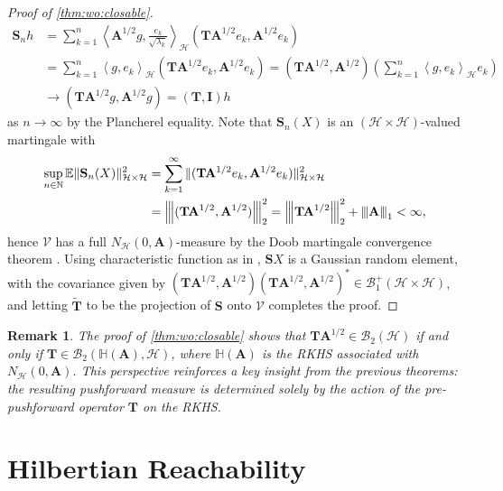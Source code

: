 \documentclass[noinfoline]{imsart}\setcounter{tocdepth}{2}
\renewcommand{\b}[1]{\mathbb{#1}} %
\newcommand{\m}[1]{\mathbf{#1}} %
\renewcommand{\c}[1]{\mathcal{#1}} %
\newcommand{\innpr}[2]{{\left\langle {#1},{#2}\right\rangle}} %
\newcommand{\vertiii}[1]{{\left\vert\kern-0.25ex\left\vert\kern-0.25ex\left\vert #1 
    \right\vert\kern-0.25ex\right\vert\kern-0.25ex\right\vert}} %
\theoremstyle{plain}
\newtheorem{remark}{Remark}[section]
\begin{document}
\begin{proof}[Proof of \cref{thm:wo:closable}]
\begin{align*}
    \m{S}_{n} h &= \sum_{k=1}^{n} \innpr{\m{A}^{1/2} g}{\frac{e_{k}}{\sqrt{\lambda_{k}}}}_{\c{H}} (\m{T} \m{A}^{1/2} e_{k}, \m{A}^{1/2} e_{k}) \\
    &= \sum_{k=1}^{n} \innpr{g}{e_{k}}_{\c{H}} (\m{T} \m{A}^{1/2} e_{k}, \m{A}^{1/2} e_{k}) = (\m{T}\m{A}^{1/2}, \m{A}^{1/2})  \left(\sum_{k=1}^{n} \innpr{g}{e_{k}}_{\c{H}} e_{k} \right) \\
    &\to (\m{T} \m{A}^{1/2} g, \m{A}^{1/2} g) = (\m{T}, \m{I}) h
\end{align*}
as $n \to \infty$ by the Plancherel equality.
Note that $\m{S}_{n}(X)$ is an $(\c{H} \times \c{H})$-valued martingale with
\begin{align*}
    \sup_{n \in \b{N}} \b{E} \|\m{S}_{n}(X)\|_{\c{H} \times \c{H}}^{2} &= \sum_{k=1}^{\infty} \|(\m{T} \m{A}^{1/2} e_{k}, \m{A}^{1/2} e_{k})\|_{\c{H} \times \c{H}}^{2} \\
    &= \vertiii{(\m{T} \m{A}^{1/2}, \m{A}^{1/2})}_{2}^{2} = \vertiii{\m{T} \m{A}^{1/2}}_{2}^{2} + \vertiii{\m{A}}_{1} < \infty,
\end{align*}
hence $\c{V}$ has a full $N_{\c{H}}(0, \m{A})$-measure by the Doob martingale convergence theorem \cite{kallenberg1997foundations}. Using characteristic function as in \cite[Proposition 4.40]{hairer2009introduction}, $\m{S} X$ is a Gaussian random element, with the covariance given by $(\m{T} \m{A}^{1/2}, \m{A}^{1/2})(\m{T} \m{A}^{1/2}, \m{A}^{1/2})^{*} \in \c{B}_{1}^{+}(\c{H} \times \c{H})$, and letting $\tilde{\m{T}}$ to be the projection of $\m{S}$ onto $\c{V}$ completes the proof.
\end{proof}

\begin{remark}
The proof of \cref{thm:wo:closable} shows that $\m{T} \m{A}^{1/2} \in \c{B}_{2}(\c{H})$ if and only if $\m{T} \in \c{B}_{2}(\b{H}(\m{A}), \c{H})$, where $\b{H}(\m{A})$ is the RKHS associated with $N_{\c{H}}(0, \m{A})$. This perspective reinforces a key insight from the previous theorems: the resulting pushforward measure is determined solely by the action of the pre-pushforward operator $\m{T}$ on the RKHS.
\end{remark}





\section{Hilbertian Reachability}\label{sec:hilb:reach}
\end{document}
